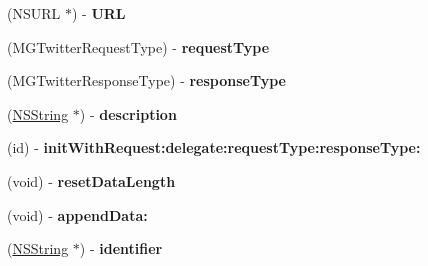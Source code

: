 \begin{DoxyCompactItemize}
\item 
\hypertarget{interface_m_g_twitter_h_t_t_p_u_r_l_connection_a0ff79a129c0adc8da817b6b675e589db}{
(\-N\-S\-U\-R\-L $\ast$) -\/ {\bfseries \-U\-R\-L}}
\label{interface_m_g_twitter_h_t_t_p_u_r_l_connection_a0ff79a129c0adc8da817b6b675e589db}

\item 
\hypertarget{interface_m_g_twitter_h_t_t_p_u_r_l_connection_a952eebcbec9734d32b072d2ff485f5f0}{
(\-M\-G\-Twitter\-Request\-Type) -\/ {\bfseries request\-Type}}
\label{interface_m_g_twitter_h_t_t_p_u_r_l_connection_a952eebcbec9734d32b072d2ff485f5f0}

\item 
\hypertarget{interface_m_g_twitter_h_t_t_p_u_r_l_connection_aee2fd0626110aeeca0ecc642fe069292}{
(\-M\-G\-Twitter\-Response\-Type) -\/ {\bfseries response\-Type}}
\label{interface_m_g_twitter_h_t_t_p_u_r_l_connection_aee2fd0626110aeeca0ecc642fe069292}

\item 
\hypertarget{interface_m_g_twitter_h_t_t_p_u_r_l_connection_a51f3bc21958c3ad70c99696c3f094041}{
(\hyperlink{class_n_s_string}{\-N\-S\-String} $\ast$) -\/ {\bfseries description}}
\label{interface_m_g_twitter_h_t_t_p_u_r_l_connection_a51f3bc21958c3ad70c99696c3f094041}

\item 
\hypertarget{interface_m_g_twitter_h_t_t_p_u_r_l_connection_ae9f49aec475cdb37ba4d7b13b714676e}{
(id) -\/ {\bfseries init\-With\-Request\-:delegate\-:request\-Type\-:response\-Type\-:}}
\label{interface_m_g_twitter_h_t_t_p_u_r_l_connection_ae9f49aec475cdb37ba4d7b13b714676e}

\item 
\hypertarget{interface_m_g_twitter_h_t_t_p_u_r_l_connection_aab2b67bae8793a2b01722e0247874251}{
(void) -\/ {\bfseries reset\-Data\-Length}}
\label{interface_m_g_twitter_h_t_t_p_u_r_l_connection_aab2b67bae8793a2b01722e0247874251}

\item 
\hypertarget{interface_m_g_twitter_h_t_t_p_u_r_l_connection_a9e6f7ee990f377401643e299704767f7}{
(void) -\/ {\bfseries append\-Data\-:}}
\label{interface_m_g_twitter_h_t_t_p_u_r_l_connection_a9e6f7ee990f377401643e299704767f7}

\item 
\hypertarget{interface_m_g_twitter_h_t_t_p_u_r_l_connection_a4fc426b6d9956d3ddeb4cfb434021ed8}{
(\hyperlink{class_n_s_string}{\-N\-S\-String} $\ast$) -\/ {\bfseries identifier}}
\label{interface_m_g_twitter_h_t_t_p_u_r_l_connection_a4fc426b6d9956d3ddeb4cfb434021ed8}


\end{DoxyCompactItemize}
